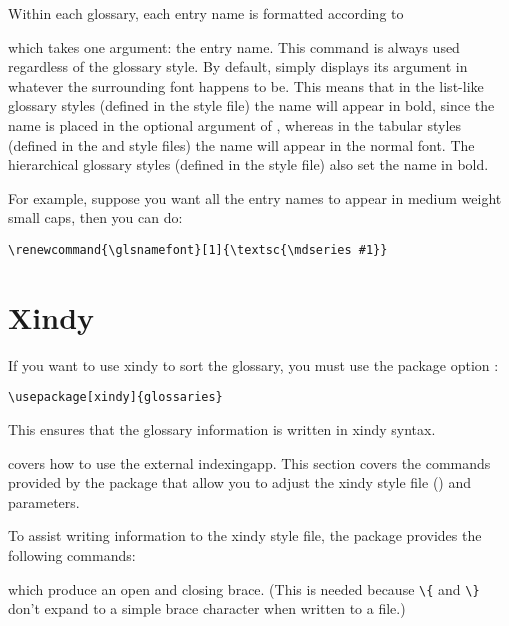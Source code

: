\documentclass[report]{nlctdoc}
\begin{document}
Within each glossary, each entry name is formatted according to
\begin{definition}[\DescribeMacro{\glsnamefont}]
\end{definition}
which takes one argument: the entry name. This command is always
used regardless of the glossary style. By default, 
simply displays its argument in whatever the surrounding font
happens to be. This means that in the list-like glossary styles
(defined in the  style file) the name will appear
in bold, since the name is placed in the optional argument of
, whereas in the tabular styles (defined in the
 and  style files) the name
will appear in the normal font. The hierarchical glossary styles
(defined in the  style file) also set the name in
bold.

For example, suppose you want all the entry names to appear in 
medium weight small caps, then you can do:
\begin{verbatim}
\renewcommand{\glsnamefont}[1]{\textsc{\mdseries #1}}
\end{verbatim}


\chapter{Xindy}
\label{sec:xindy}

If you want to use \gls{xindy} to sort the glossary, you
must use the package option :
\begin{verbatim}
\usepackage[xindy]{glossaries}
\end{verbatim}
This ensures that the glossary information is written in 
\gls*{xindy} syntax.

 covers how to use the external
\gls{indexingapp}. This section covers the commands provided
by the  package that allow you to adjust the
\gls{xindy} style file () and parameters.

To assist writing information to the \gls{xindy} style
file, the  package provides the following
commands:
\begin{definition}[\DescribeMacro{\glsopenbrace}]
\end{definition}
\begin{definition}[\DescribeMacro{\glsclosebrace}]
\end{definition}
which produce an open and closing brace. (This is needed because
\verb|\{| and \verb|\}| don't expand to a simple brace character
when written to a file.)
\end{document}
